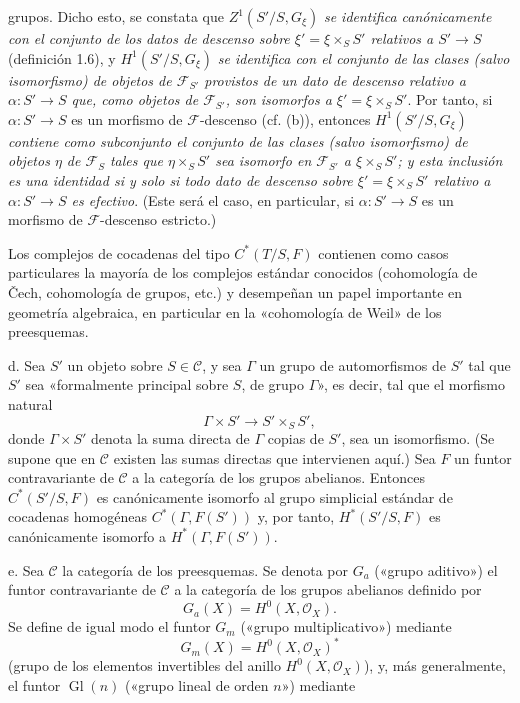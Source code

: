 grupos. Dicho esto, se constata que $Z^1(S'/S,G_\xi)$ \emph{se identifica
canónicamente con el conjunto de los datos de descenso sobre
$\xi'=\xi\times_SS'$ relativos a $S'\longrightarrow S$} (definición 1.6), y
$H^1(S'/S,G_\xi)$ \emph{se identifica con el conjunto de las clases (salvo
isomorfismo) de objetos de $\mathcal F_{S'}$ provistos de un dato de descenso
relativo a $\alpha:S'\longrightarrow S$ que, como objetos de
$\mathcal F_{S'}$, son isomorfos a $\xi'=\xi\times_SS'$}. Por tanto, si
$\alpha:S'\longrightarrow S$ es un morfismo de $\mathcal F$-descenso
(cf. (b)), entonces $H^1(S'/S,G_\xi)$ \emph{contiene como subconjunto el
conjunto de las clases (salvo isomorfismo) de objetos $\eta$ de
$\mathcal F_S$ tales que $\eta\times_SS'$ sea isomorfo en
$\mathcal F_{S'}$ a $\xi\times_SS'$; y esta inclusión es una identidad si y
solo si todo dato de descenso sobre $\xi'=\xi\times_SS'$ relativo a
$\alpha:S'\longrightarrow S$ es efectivo}. (Este será el caso, en particular,
si $\alpha:S'\longrightarrow S$ es un morfismo de $\mathcal F$-descenso
estricto.)

 Los complejos de cocadenas del tipo $C^*(T/S,F)$
contienen como casos particulares la mayoría de los complejos estándar
conocidos (cohomología de Čech, cohomología de grupos, etc.) y desempeñan un
papel importante en geometría algebraica, en particular en la «cohomología de
Weil» de los preesquemas.

\medskip\noindent
d.  Sea $S'$ un objeto sobre $S\in\mathcal C$, y sea
$\Gamma$ un grupo de automorfismos de $S'$ tal que $S'$ sea «formalmente
principal sobre $S$, de grupo $\Gamma$», es decir, tal que el morfismo natural
\[
  \Gamma\times S'\longrightarrow S'\times_SS',
\]
donde $\Gamma\times S'$ denota la suma directa de $\Gamma$ copias de $S'$, sea
un isomorfismo. (Se supone que en $\mathcal C$ existen las sumas directas que
intervienen aquí.) Sea $F$ un funtor contravariante de $\mathcal C$ a la
categoría de los grupos abelianos. Entonces $C^*(S'/S,F)$ es canónicamente
isomorfo al grupo simplicial estándar de cocadenas homogéneas
$C^*(\Gamma,F(S'))$ y, por tanto, $H^*(S'/S,F)$ es canónicamente isomorfo a
$H^*(\Gamma,F(S'))$.

\medskip\noindent
e.  Sea $\mathcal C$ la categoría de los preesquemas. Se
denota por $G_a$ («grupo aditivo») el funtor contravariante de $\mathcal C$ a
la categoría de los grupos abelianos definido por
\[
  G_a(X)=H^0(X,\mathcal O_X).
\]
Se define de igual modo el funtor $G_m$ («grupo multiplicativo») mediante
\[
  G_m(X)=H^0(X,\mathcal O_X)^*
\]
(grupo de los elementos invertibles del anillo $H^0(X,\mathcal O_X)$), y, más
generalmente, el funtor $\operatorname{Gl}(n)$ («grupo lineal de orden $n$»)
mediante

